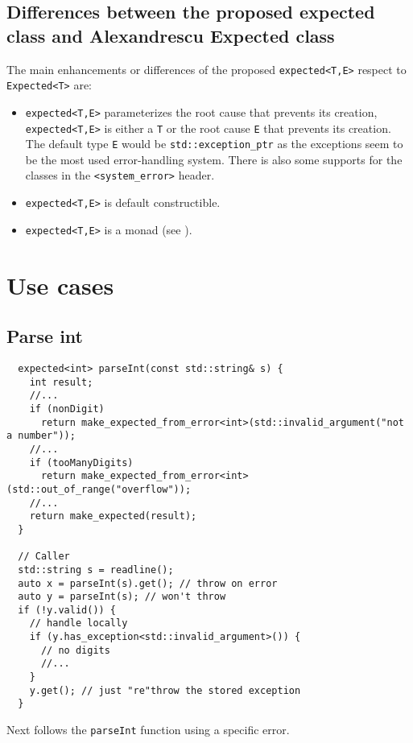 \documentclass[a4paper,10pt]{article}
\newcommand{\cpp}[1]{\lstinline{#1}}
\begin{document}
\subsection{Differences between the proposed expected class and Alexandrescu Expected class}

The main enhancements or differences of the proposed \cpp{expected<T,E>} respect to \cpp{Expected<T>} are:
\begin{itemize}
 \item \cpp{expected<T,E>} parameterizes the root cause that prevents its creation, \cpp{expected<T,E>} is either a \cpp{T} or the root cause \cpp{E} that prevents its creation. The default type \cpp{E} would be \cpp{std::exception_ptr} as the exceptions seem to be the most used error-handling system. There is also some supports for the classes in the \cpp{<system_error>} header.
 \item \cpp{expected<T,E>} is default constructible.
 \item \cpp{expected<T,E>} is a monad (see \cite{MONAD}).
\end{itemize}

\section{Use cases}

\subsection{Parse int}

\begin{lstlisting}
  expected<int> parseInt(const std::string& s) {
    int result;
    //...
    if (nonDigit)  
      return make_expected_from_error<int>(std::invalid_argument("not a number"));
    //...
    if (tooManyDigits) 
      return make_expected_from_error<int>(std::out_of_range("overflow"));
    //...
    return make_expected(result);
  }

  // Caller
  std::string s = readline();
  auto x = parseInt(s).get(); // throw on error
  auto y = parseInt(s); // won't throw
  if (!y.valid()) {
    // handle locally
    if (y.has_exception<std::invalid_argument>()) {
      // no digits
      //...
    }
    y.get(); // just "re"throw the stored exception
  }
\end{lstlisting}

Next follows the \cpp{parseInt} function using a specific error.
\end{document}
